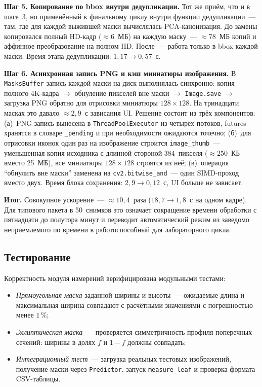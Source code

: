 \textbf{Шаг 5. Копирование по bbox внутри дедупликации.} Тот же приём, что и
в шаге~3, но применённый к финальному циклу внутри функции дедупликации~---
там, где для каждой выжившей маски вычислялась PCA-канонизация. До замены
копировался полный HD-кадр ($\approx 6$~МБ) на каждую маску~--- $\approx 78$~МБ
копий и аффинное преобразование на полном HD. После~--- работа только в bbox
каждой маски. Время этапа дедупликации: $1{,}17 \to 0{,}57$~с.

\textbf{Шаг 6. Асинхронная запись PNG и кэш миниатюры изображения.}
В \texttt{MasksBuffer} запись каждой маски на диск выполнялась синхронно: копия
полного 4K-кадра $\to$ обнуление пикселей вне маски $\to$ \texttt{Image.save}
$\to$ загрузка PNG обратно для отрисовки миниатюры $128 \times 128$. На тринадцати
масках это давало $\approx 2{,}9$~с зависания UI. Решение состоит из трёх
компонентов: (а)~PNG-запись вынесена в \texttt{ThreadPoolExecutor} из четырёх
потоков, futures хранятся в словаре \texttt{\_pending} и при необходимости
ожидаются точечно; (б)~для отрисовки иконок один раз на изображение строится
\texttt{image\_thumb}~--- уменьшенная копия исходника с длинной стороной
$384$~пикселя ($\approx 250$~КБ вместо 25~МБ), все миниатюры $128 \times 128$
строятся из неё; (в)~операция ``обнулить вне маски'' заменена на
\texttt{cv2.bitwise\_and}~--- один SIMD-проход вместо двух. Время блока сохранения:
$2{,}9 \to 0{,}12$~с, UI больше не зависает.

\textbf{Итог.} Совокупное ускорение~--- $\approx 10{,}4$~раза ($18{,}7 \to 1{,}8$~с
на одном кадре). Для типового пакета в 50~снимков это означает сокращение времени
обработки с пятнадцати до полутора минут и переводит автоматический режим из
заведомо неприемлемого по времени в работоспособный для лабораторного цикла.

\subsection{Тестирование}
\label{sec:testing}

Корректность модуля измерений верифицирована модульными тестами:

\begin{itemize}
    \item \textit{Прямоугольная маска} заданной ширины и высоты~--- ожидаемые длина
          и максимальная ширина совпадают с расчётными значениями с погрешностью
          менее $1\,\%$;
    \item \textit{Эллиптическая маска}~--- проверяется симметричность профиля
          поперечных сечений: ширины в долях $f$ и $1 - f$ должны совпадать;
    \item \textit{Интеграционный тест}~--- загрузка реальных тестовых изображений,
          получение маски через \texttt{Predictor}, запуск \texttt{measure\_leaf}
          и проверка формата CSV-таблицы.
\end{itemize}

